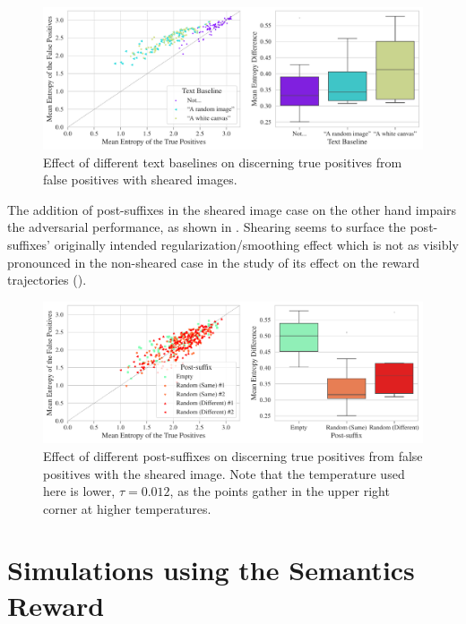 \begin{figure}[H]
    \centering
    \includegraphics[width=\textwidth]{images/baseline_sheared_adversarial_2.pdf}
    \caption{Effect of different text baselines on discerning true positives from false positives with sheared images.}
    \label{fig:baseline_sheared_adversarial}
\end{figure}

The addition of post-suffixes in the sheared image case on the other hand impairs the adversarial performance, as shown in .
Shearing seems to surface the post-suffixes' originally intended regularization/smoothing effect which is not as visibly pronounced in the non-sheared case in the study of its effect on the reward trajectories ().

\begin{figure}[H]
    \centering
    \includegraphics[width=\textwidth]{images/post-suffix_sheared_adversarial_12.pdf}
    \caption[Effect of different post-suffixes on discerning true positives from false positives with sheared images.]{Effect of different post-suffixes on discerning true positives from false positives with the sheared image. Note that the temperature used here is lower, \(\tau = 0.012\), as the points gather in the upper right corner at higher temperatures.}
    \label{fig:post-suffix_sheared_adversarial}
\end{figure}

\section{Simulations using the Semantics Reward}
\label{sec:simulations}

